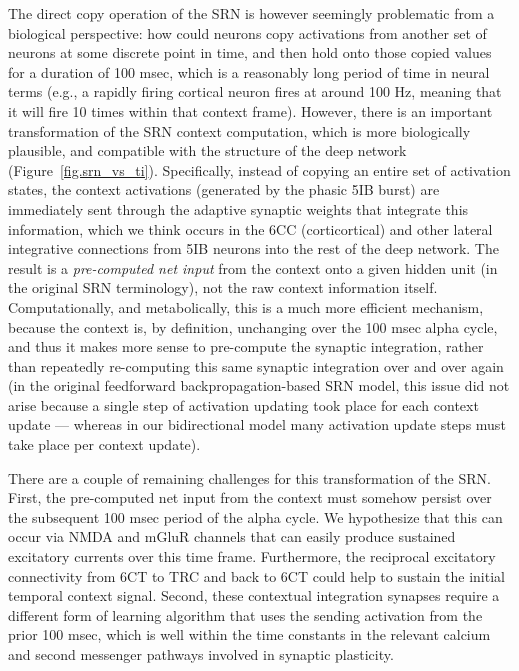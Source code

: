 \documentclass[12pt,twoside]{article}
\newif\myifpdf
\begin{document}
The direct copy operation of the SRN is however seemingly problematic from a biological perspective: how could neurons copy activations from another set of neurons at some discrete point in time, and then hold onto those copied values for a duration of 100 msec, which is a reasonably long period of time in neural terms (e.g., a rapidly firing cortical neuron fires at around 100 Hz, meaning that it will fire 10 times within that context frame).  However, there is an important transformation of the SRN context computation, which is more biologically plausible, and compatible with the structure of the deep network (Figure~\ref{fig.srn_vs_ti}). Specifically, instead of copying an entire set of activation states, the context activations (generated by the phasic 5IB burst) are immediately sent through the adaptive synaptic weights that integrate this information, which we think occurs in the 6CC (corticortical) and other lateral integrative connections from 5IB neurons into the rest of the deep network.  The result is a {\em pre-computed net input} from the context onto a given hidden unit (in the original SRN terminology), not the raw context information itself.  Computationally, and metabolically, this is a much more efficient mechanism, because the context is, by definition, unchanging over the 100 msec alpha cycle, and thus it makes more sense to pre-compute the synaptic integration, rather than repeatedly re-computing this same synaptic integration over and over again (in the original feedforward backpropagation-based SRN model, this issue did not arise because a single step of activation updating took place for each context update --- whereas in our bidirectional model many activation update steps must take place per context update).

There are a couple of remaining challenges for this transformation of the SRN.  First, the pre-computed net input from the context must somehow persist over the subsequent 100 msec period of the alpha cycle.  We hypothesize that this can occur via NMDA and mGluR channels that can easily produce sustained excitatory currents over this time frame.  Furthermore, the reciprocal excitatory connectivity from 6CT to TRC and back to 6CT could help to sustain the initial temporal context signal.  Second, these contextual integration synapses require a different form of learning algorithm that uses the sending activation from the prior 100 msec, which is well within the time constants in the relevant calcium and second messenger pathways involved in synaptic plasticity.
\end{document}
